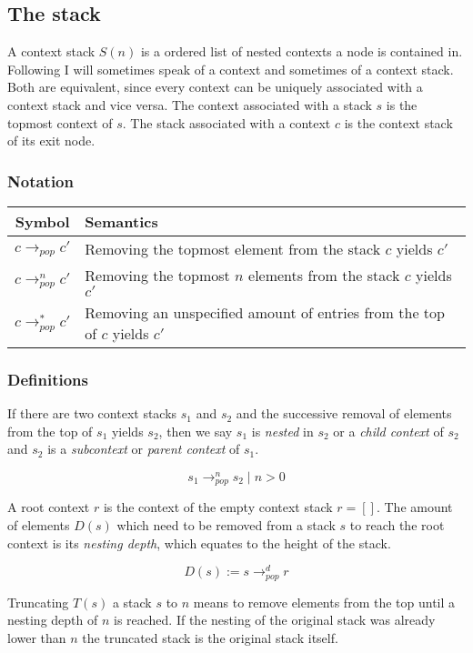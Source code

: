 \subsection{The stack}

A context stack $S(n)$ is a ordered list of nested contexts a node is contained in.
Following I will sometimes speak of a context and sometimes of a context stack.
Both are equivalent, since every context can be uniquely associated with a context stack and vice versa.
The context associated with a stack $s$ is the topmost context of $s$.
The stack associated with a context $c$ is the context stack of its exit node.

\subsubsection{Notation}

\begin{tabular}{c | l}
  Symbol & Semantics \\ \hline
  $c \rightarrow_{pop} c'$ & Removing the topmost element from the stack $c$ yields $c'$ \\
  $c \rightarrow_{pop}^n c'$ & Removing the topmost $n$ elements from the stack $c$ yields $c'$ \\
  $c \rightarrow_{pop}^* c'$ & Removing an unspecified amount of entries from the top of $c$ yields $c'$ \\
\end{tabular}

\subsubsection{Definitions}

If there are two context stacks $s_1$ and $s_2$ and the successive removal of elements from the top of $s_1$ yields $s_2$, then we say $s_1$ is \textit{nested} in $s_2$ or a \emph{child context} of $s_2$ and $s_2$ is a \textit{subcontext} or \emph{parent context} of $s_1$.

\[
  s_1 \rightarrow_{pop}^n s_2 \mid n > 0
\]

A root context $r$ is the context of the empty context stack $r = []$.
The amount of elements $D(s)$ which need to be removed from a stack $s$ to reach the root context is its \emph{nesting depth}, which equates to the height of the stack.

\[
  D(s) := s \rightarrow_{pop}^d r
\]

Truncating $T(s)$ a stack $s$ to $n$ means to remove elements from the top until a nesting depth of $n$ is reached.
If the nesting of the original stack was already lower than $n$ the truncated stack is the original stack itself.

